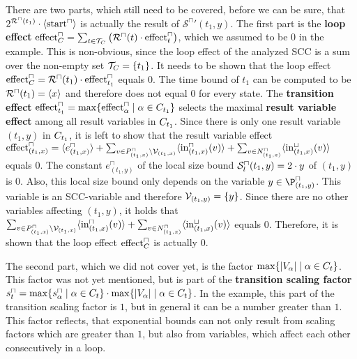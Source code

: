 There are two parts, which still need to be covered, before we can be sure, that $2^{{\mathcal{R}^\sqcap}(t_1)} \cdot \langle\text{start}^\sqcap\rangle$ is actually the result of ${\mathcal{S}^\sqcap}'(t_1,y)$.
The first part is the \textbf{loop effect} $\text{effect}^\sqcap_C = \sum_{t \in \mathcal{T}_C} \left( {\mathcal{R}^\sqcap}(t) \cdot \text{effect}^\sqcap_t \right)$, which we assumed to be $0$ in the example.
This is non-obvious, since the loop effect of the analyzed SCC is a sum over the non-empty set $\mathcal{T}_C = \lbrace t_1 \rbrace$.
It needs to be shown that the loop effect $\text{effect}^\sqcap_C = {\mathcal{R}^\sqcap}(t_1) \cdot \text{effect}^\sqcap_{t_1}$ equals $0$.
The time bound of $t_1$ can be computed to be ${\mathcal{R}^\sqcap}(t_1) = \langle x\rangle$ and therefore does not equal $0$ for every state.
The \textbf{transition effect} $\text{effect}^\sqcap_{t_1} = \max \lbrace \text{effect}^\sqcap_\alpha \mid \alpha \in C_{t_1}  \rbrace$ selects the maximal \textbf{result variable effect} among all result variables in $C_{t_1}$.
Since there is only one result variable $(t_1,y)$ in $C_{t_1}$, it is left to show that the result variable effect $\text{effect}^\sqcap_{(t_1,x)} = \langle e^\sqcap_{(t_1,x)}\rangle + \sum_{v \in P_{(t_1,x)}^\sqcap \setminus \mathcal{V}_{(t_1,x)}} \langle\text{in}^\sqcap_{(t_1,x)}(v)\rangle + \sum_{v \in N_{(t_1,x)}^\sqcap} \langle\text{in}^\sqcup_{(t_1,x)}(v)\rangle$ equals $0$.
The constant $e^\sqcap_{(t_1,y)}$ of the local size bound ${\mathcal{S}^\sqcap_l}(t_1,y) = 2 \cdot y$ of $(t_1,y)$ is $0$.
Also, this local size bound only depends on the variable $y \in \P^\sqcap_{(t_1,y)}$.
This variable is an SCC-variable and therefore $\mathcal{V}_{(t_1,y)} = \lbrace y \rbrace$.
Since there are no other variables affecting $(t_1,y)$, it holds that $\sum_{v \in P_{(t_1,x)}^\sqcap \setminus \mathcal{V}_{(t_1,x)}} \langle\text{in}^\sqcap_{(t_1,x)}(v)\rangle + \sum_{v \in N_{(t_1,x)}^\sqcap} \langle\text{in}^\sqcup_{(t_1,x)}(v)\rangle$ equals $0$.
Therefore, it is shown that the loop effect $\text{effect}^\sqcap_C$ is actually $0$.


The second part, which we did not cover yet, is the factor $\max \lbrace \left|V_\alpha\right| \mid \alpha \in C_t \rbrace$.
This factor was not yet mentioned, but is part of the \textbf{transition scaling factor} $s^\sqcap_t = \max \lbrace s^\sqcap_\alpha \mid \alpha \in C_t \rbrace \cdot \max \lbrace \left|V_\alpha\right| \mid \alpha \in C_t \rbrace$.
In the example, this part of the transition scaling factor is $1$, but in general it can be a number greater than $1$.
This factor reflects, that exponential bounds can not only result from scaling factors which are greater than $1$, but also from variables, which affect each other consecutively in a loop.

